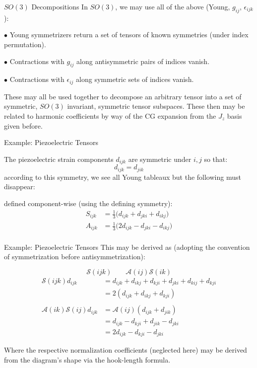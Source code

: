 \documentclass[11pt]{beamer}
\begin{document}
\begin{frame}{$SO(3)$ Decompositions}
\small
In $SO(3)$, we may use all of the above (Young, $g_{ij}$, $\epsilon_{ijk}$):

\medskip

$\bullet$ Young symmetrizers return a set of tensors of known symmetries (under index permutation).

\medskip


$\bullet$ Contractions with $g_{ij}$ along antisymmetric pairs of indices vanish.

\medskip

$\bullet$ Contractions with $\epsilon_{ij}$ along symmetric sets of indices vanish.

\vspace{1cm}

These may all be used together to decompose an arbitrary tensor into a set of symmetric, $SO(3)$ invariant, symmetric tensor subspaces. These then may be related to harmonic coefficients by way of the CG expansion from the $J_z$ basis given before.
\end{frame}
\begin{frame}{Example: Piezoelectric Tensors}

The piezoelectric strain components $d_{ijk}$ are symmetric under $i,j$ so that:
$$
d_{ijk}=d_{jik}
$$
according to this symmetry, we see all Young tableaux but the following must disappear:
\begin{center}
\end{center}defined component-wise (using the defining symmetry):
\begin{align*}
S_{ijk}&=\frac{1}{3}\big(d_{ijk}+d_{jki}+d_{ikj}\big)\\
A_{ijk}&=\frac{1}{3}\big(2d_{ijk}-d_{jki}-d_{ikj}\big)\\
\end{align*}
\end{frame}
\begin{frame}{Example: Piezoelectric Tensors}
This may be derived as (adopting the convention of symmetrization before antisymmetrization):
\begin{center}\small
$$
\mathcal{S}(ijk)\quad\quad \mathcal{A}(ij)\mathcal{S}(ik)
$$
\begin{align*}
\mathcal{S}(ijk)d_{ijk}& =d_{ijk}+d_{ikj}+d_{kji}+d_{jki}+d_{kij}+d_{kji}\\
&=2( d_{ijk}+d_{ikj}+d_{kji})\\
\\
\mathcal{A}(ik)\mathcal{S}(ij)d_{ijk}& =\mathcal{A}(ij)(d_{ijk}+d_{jik})\\
&=d_{ijk}-d_{kji}+d_{jik}-d_{jki}\\
&= 2d_{ijk}-d_{kji}-d_{jki}
\end{align*}
\end{center}
Where the respective normalization coefficients (neglected here) may be derived from the diagram's shape via the hook-length formula.
\end{frame}
\end{document}
